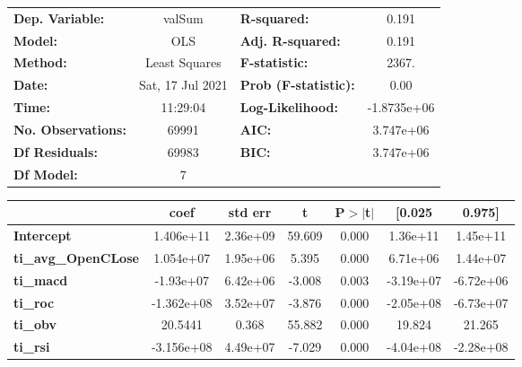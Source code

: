\begin{center}
\begin{tabular}{lclc}
\toprule
\textbf{Dep. Variable:}     &      valSum      & \textbf{  R-squared:         } &      0.191   \\
\textbf{Model:}             &       OLS        & \textbf{  Adj. R-squared:    } &      0.191   \\
\textbf{Method:}            &  Least Squares   & \textbf{  F-statistic:       } &      2367.   \\
\textbf{Date:}              & Sat, 17 Jul 2021 & \textbf{  Prob (F-statistic):} &      0.00    \\
\textbf{Time:}              &     11:29:04     & \textbf{  Log-Likelihood:    } & -1.8735e+06  \\
\textbf{No. Observations:}  &       69991      & \textbf{  AIC:               } &  3.747e+06   \\
\textbf{Df Residuals:}      &       69983      & \textbf{  BIC:               } &  3.747e+06   \\
\textbf{Df Model:}          &           7      & \textbf{                     } &              \\
\bottomrule
\end{tabular}
\begin{tabular}{lcccccc}
                            & \textbf{coef} & \textbf{std err} & \textbf{t} & \textbf{P$> |$t$|$} & \textbf{[0.025} & \textbf{0.975]}  \\
\midrule
\textbf{Intercept}          &    1.406e+11  &     2.36e+09     &    59.609  &         0.000        &     1.36e+11    &     1.45e+11     \\
\textbf{ti\_avg\_OpenCLose} &    1.054e+07  &     1.95e+06     &     5.395  &         0.000        &     6.71e+06    &     1.44e+07     \\
\textbf{ti\_macd}           &    -1.93e+07  &     6.42e+06     &    -3.008  &         0.003        &    -3.19e+07    &    -6.72e+06     \\
\textbf{ti\_roc}            &   -1.362e+08  &     3.52e+07     &    -3.876  &         0.000        &    -2.05e+08    &    -6.73e+07     \\
\textbf{ti\_obv}            &      20.5441  &        0.368     &    55.882  &         0.000        &       19.824    &       21.265     \\
\textbf{ti\_rsi}            &   -3.156e+08  &     4.49e+07     &    -7.029  &         0.000        &    -4.04e+08    &    -2.28e+08     \\

\end{tabular}
\end{center}
